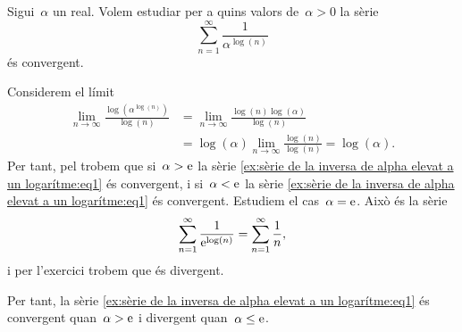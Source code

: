 \documentclass[../../main.tex]{subfiles}
\begin{document}
    \begin{example}
        \label{ex:sèrie de la inversa de alpha elevat a un logarítme}
        Sigui~\(\alpha\) un real.
        Volem estudiar per a quins valors de~\(\alpha>0\) la sèrie
        \begin{equation}
            \label{ex:sèrie de la inversa de alpha elevat a un logarítme:eq1}
            \sum_{n=1}^{\infty}\frac{1}{\alpha^{\log(n)}}
        \end{equation}
        és convergent.
        \begin{solution}
            Considerem el límit
            \begin{align*}
                \lim_{n\to\infty}\frac{\log\left(\alpha^{\log(n)}\right)}{\log(n)}&=\lim_{n\to\infty}\frac{\log(n)\log(\alpha)}{\log(n)} \\
                &=\log(\alpha)\lim_{n\to\infty}\frac{\log(n)}{\log(n)}=\log(\alpha).
            \end{align*}
            Per tant, pel  trobem que si~\(\alpha>\mathrm{e}\) la sèrie \eqref{ex:sèrie de la inversa de alpha elevat a un logarítme:eq1} és convergent, i si~\(\alpha<\mathrm{e}\) la sèrie \eqref{ex:sèrie de la inversa de alpha elevat a un logarítme:eq1} és convergent.
            Estudiem el cas~\(\alpha=\mathrm{e}\).
            Això és la sèrie
            \[
                \sum_{n=1}^{\infty}\frac{1}{\mathrm{e}^{\log(n)}}=\sum_{n=1}^{\infty}\frac{1}{n},
            \]
            i per l'exercici  trobem que és divergent.

            Per tant, la sèrie \eqref{ex:sèrie de la inversa de alpha elevat a un logarítme:eq1} és convergent quan~\(\alpha>\mathrm{e}\) i divergent quan~\(\alpha\leq\mathrm{e}\).
        \end{solution}
    \end{example}
\end{document}
